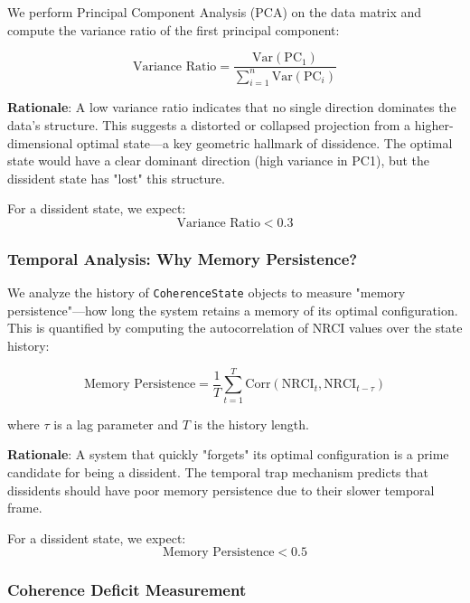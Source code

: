 \documentclass[12pt, a4paper]{article}
\begin{document}
We perform Principal Component Analysis (PCA) on the data matrix and compute the variance ratio of the first principal component:

\begin{equation}
\text{Variance Ratio} = \frac{\text{Var}(\text{PC}_1)}{\sum_{i=1}^{n} \text{Var}(\text{PC}_i)}
\end{equation}

\textbf{Rationale}: A low variance ratio indicates that no single direction dominates the data's structure. This suggests a distorted or collapsed projection from a higher-dimensional optimal state—a key geometric hallmark of dissidence. The optimal state would have a clear dominant direction (high variance in PC1), but the dissident state has "lost" this structure.

For a dissident state, we expect:
\begin{equation}
\text{Variance Ratio} < 0.3
\end{equation}

\subsubsection{Temporal Analysis: Why Memory Persistence?}

We analyze the history of \texttt{CoherenceState} objects to measure "memory persistence"—how long the system retains a memory of its optimal configuration. This is quantified by computing the autocorrelation of NRCI values over the state history:

\begin{equation}
\text{Memory Persistence} = \frac{1}{T} \sum_{t=1}^{T} \text{Corr}(\text{NRCI}_t, \text{NRCI}_{t-\tau})
\end{equation}

where $\tau$ is a lag parameter and $T$ is the history length.

\textbf{Rationale}: A system that quickly "forgets" its optimal configuration is a prime candidate for being a dissident. The temporal trap mechanism predicts that dissidents should have poor memory persistence due to their slower temporal frame.

For a dissident state, we expect:
\begin{equation}
\text{Memory Persistence} < 0.5
\end{equation}

\subsubsection{Coherence Deficit Measurement}
\end{document}

